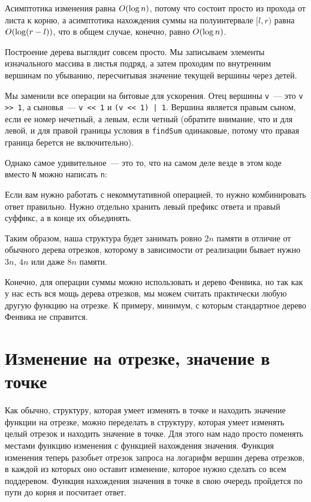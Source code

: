 Асимптотика изменения равна $O(\log n)$, потому что состоит просто из прохода от листа к корню, а асимптотика нахождения суммы на полуинтервале $[l, r)$ равна $O(\log (r - l))$, что в общем случае, конечно, равно $O(\log n)$.

Построение дерева выглядит совсем просто. Мы записываем элементы изначального массива в листья подряд, а затем проходим по внутренним вершинам по убыванию, пересчитывая значение текущей вершины через детей.



Мы заменили все операции на битовые для ускорения. Отец вершины \verb+v+~--- это \verb+v >> 1+, а сыновья~--- \verb+v << 1+ и \verb+(v << 1) | 1+. Вершина является правым сыном, если ее номер нечетный, а левым, если четный (обратите внимание, что и для левой, и для правой границы условия в \verb+findSum+ одинаковые, потому что правая граница берется не включительно).

Однако самое удивительное~--- это то, что на самом деле везде в этом коде вместо \verb+N+ можно написать \verb+n+:



\begin{observation}
    Если вам нужно работать с некоммутативной операцией, то нужно комбинировать ответ правильно. Нужно отдельно хранить левый префикс ответа и правый суффикс, а в конце их объединять.
\end{observation}

Таким образом, наша структура будет занимать ровно $2n$ памяти в отличие от обычного дерева отрезков, которому в зависимости от реализации бывает нужно $3n$, $4n$ или даже $8n$ памяти.

Конечно, для операции суммы можно использовать и дерево Фенвика, но так как у нас есть вся мощь дерева отрезков, мы можем считать практически любую другую функцию на отрезке. К примеру, минимум, с которым стандартное дерево Фенвика не справится.

\section{Изменение на отрезке, значение в точке}

Как обычно, структуру, которая умеет изменять в точке и находить значение функции на отрезке, можно переделать в структуру, которая умеет изменять целый отрезок и находить значение в точке. Для этого нам надо просто поменять местами функцию изменения с функцией нахождения значения. Функция изменения теперь разобьет отрезок запроса на логарифм вершин дерева отрезков, в каждой из которых оно оставит изменение, которое нужно сделать со всем поддеревом. Функция нахождения значения в точке в свою очередь пройдется по пути до корня и посчитает ответ.

